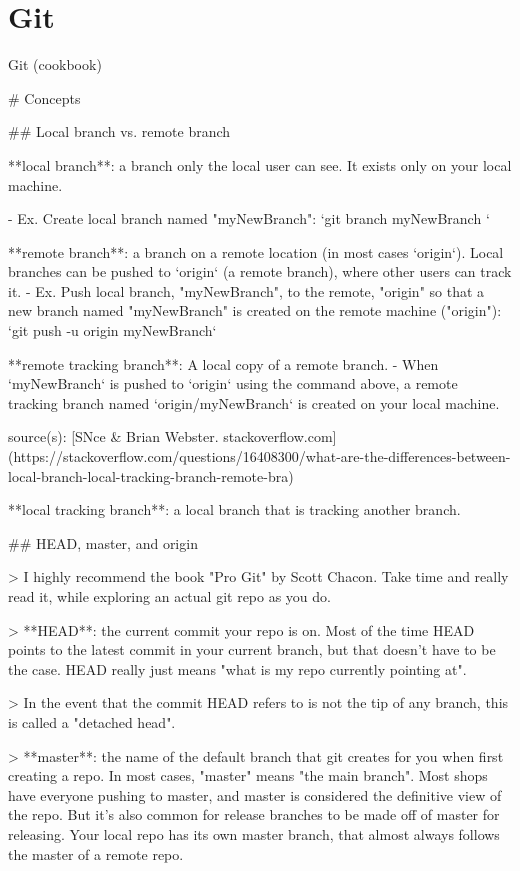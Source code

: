 \chapter{Git}

Git (cookbook)


# Concepts

## Local branch vs. remote branch

**local branch**:  a branch only the local user can see. It exists only on your local machine.

- Ex. Create local branch named "myNewBranch":
`git branch myNewBranch  `

**remote branch**: a branch on a remote location (in most cases `origin`). Local branches can be pushed to `origin` (a remote branch), where other users can track it.
- Ex. Push local branch, "myNewBranch", to the remote, "origin" so that a new branch named "myNewBranch" is created on the remote machine ("origin"):
`git push -u origin myNewBranch`

**remote tracking branch**: A local copy of a remote branch.
- When `myNewBranch` is pushed to `origin` using the command above, a remote tracking branch named `origin/myNewBranch` is created on your local machine.

source(s): [SNce & Brian Webster. stackoverflow.com](https://stackoverflow.com/questions/16408300/what-are-the-differences-between-local-branch-local-tracking-branch-remote-bra)

**local tracking branch**: a local branch that is tracking another branch.

## HEAD, master, and origin

> I highly recommend the book "Pro Git" by Scott Chacon. Take time and really read it, while exploring an actual git repo as you do.

> **HEAD**: the current commit your repo is on. Most of the time HEAD points to the latest commit in your current branch, but that doesn't have to be the case. HEAD really just means "what is my repo currently pointing at".

> In the event that the commit HEAD refers to is not the tip of any branch, this is called a "detached head".

> **master**: the name of the default branch that git creates for you when first creating a repo. In most cases, "master" means "the main branch". Most shops have everyone pushing to master, and master is considered the definitive view of the repo. But it's also common for release branches to be made off of master for releasing. Your local repo has its own master branch, that almost always follows the master of a remote repo.

